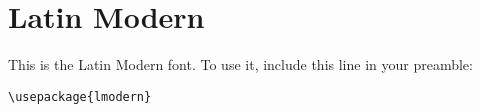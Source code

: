\documentclass{article}
\begin{document}
\section*{Latin Modern}
This is the Latin Modern font.
To use it, include this line in your preamble:
\begin{verbatim}
\usepackage{lmodern}
\end{verbatim}


\end{document}
